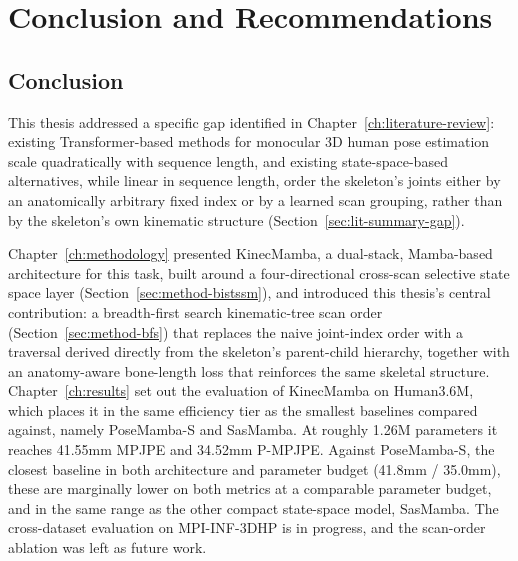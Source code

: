 \setlength{\footskip}{8mm}

\chapter{Conclusion and Recommendations}
\label{ch:conclusion}

\section{Conclusion}
\label{sec:conclusion-conclusion}

This thesis addressed a specific gap identified in
Chapter~\ref{ch:literature-review}: existing Transformer-based methods
for monocular 3D human pose estimation scale quadratically with sequence
length, and existing state-space-based alternatives, while linear in
sequence length, order the skeleton's joints either by an anatomically
arbitrary fixed index or by a learned scan grouping, rather than by the
skeleton's own kinematic structure (Section~\ref{sec:lit-summary-gap}).

Chapter~\ref{ch:methodology} presented KinecMamba, a dual-stack, Mamba-based
architecture for this task, built around a four-directional cross-scan
selective state space layer (Section~\ref{sec:method-bistssm}), and
introduced this thesis's central contribution: a breadth-first search
kinematic-tree scan order (Section~\ref{sec:method-bfs}) that replaces
the naive joint-index order with a traversal derived directly from the
skeleton's parent-child hierarchy, together with an anatomy-aware
bone-length loss that reinforces the same skeletal structure.
Chapter~\ref{ch:results} set out the evaluation of KinecMamba on Human3.6M,
which places it in the same efficiency tier as the smallest baselines
compared against, namely PoseMamba-S and SasMamba. At roughly 1.26M
parameters it reaches 41.55mm MPJPE and 34.52mm P-MPJPE. Against PoseMamba-S,
the closest baseline in both architecture and parameter budget (41.8mm /
35.0mm), these are marginally lower on both metrics at a comparable parameter
budget, and in the same range as the other compact state-space model,
SasMamba. The cross-dataset evaluation on MPI-INF-3DHP is in progress, and the
scan-order ablation was left as future work.

